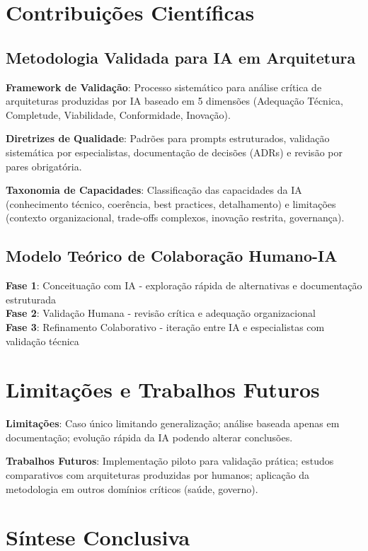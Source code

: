 \section{Contribuições Científicas}

\subsection{Metodologia Validada para IA em Arquitetura}

\textbf{Framework de Validação}: Processo sistemático para análise crítica de arquiteturas produzidas por IA baseado em 5 dimensões (Adequação Técnica, Completude, Viabilidade, Conformidade, Inovação).

\textbf{Diretrizes de Qualidade}: Padrões para prompts estruturados, validação sistemática por especialistas, documentação de decisões (ADRs) e revisão por pares obrigatória.

\textbf{Taxonomia de Capacidades}: Classificação das capacidades da IA (conhecimento técnico, coerência, best practices, detalhamento) e limitações (contexto organizacional, trade-offs complexos, inovação restrita, governança).

\subsection{Modelo Teórico de Colaboração Humano-IA}

\textbf{Fase 1}: Conceituação com IA - exploração rápida de alternativas e documentação estruturada \\
\textbf{Fase 2}: Validação Humana - revisão crítica e adequação organizacional \\
\textbf{Fase 3}: Refinamento Colaborativo - iteração entre IA e especialistas com validação técnica

\section{Limitações e Trabalhos Futuros}

\textbf{Limitações}: Caso único limitando generalização; análise baseada apenas em documentação; evolução rápida da IA podendo alterar conclusões.

\textbf{Trabalhos Futuros}: Implementação piloto para validação prática; estudos comparativos com arquiteturas produzidas por humanos; aplicação da metodologia em outros domínios críticos (saúde, governo).

\section{Síntese Conclusiva}

